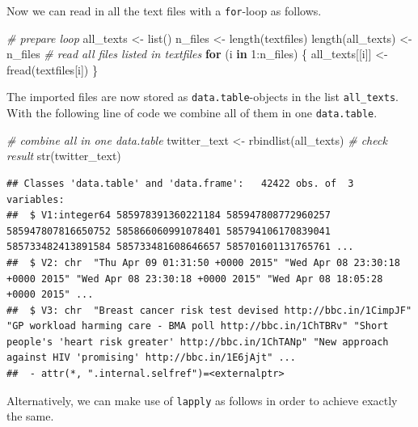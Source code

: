 \documentclass[
  12pt,
]{style/krantz}
\newenvironment{Shaded}{\begin{snugshade}}{\end{snugshade}}
\newcommand{\CommentTok}[1]{\textcolor[rgb]{0.56,0.35,0.01}{\textit{#1}}}
\newcommand{\ControlFlowTok}[1]{\textcolor[rgb]{0.13,0.29,0.53}{\textbf{#1}}}
\newcommand{\DecValTok}[1]{\textcolor[rgb]{0.00,0.00,0.81}{#1}}
\newcommand{\FunctionTok}[1]{\textcolor[rgb]{0.00,0.00,0.00}{#1}}
\newcommand{\NormalTok}[1]{#1}
\newcommand{\OtherTok}[1]{\textcolor[rgb]{0.56,0.35,0.01}{#1}}
\newcommand{\SpecialCharTok}[1]{\textcolor[rgb]{0.00,0.00,0.00}{#1}}
\begin{document}
Now we can read in all the text files with a \texttt{for}-loop as follows.

\begin{Shaded}
\begin{Highlighting}[]
\CommentTok{\# prepare loop}
\NormalTok{all\_texts }\OtherTok{\textless{}{-}} \FunctionTok{list}\NormalTok{()}
\NormalTok{n\_files }\OtherTok{\textless{}{-}} \FunctionTok{length}\NormalTok{(textfiles)}
\FunctionTok{length}\NormalTok{(all\_texts) }\OtherTok{\textless{}{-}}\NormalTok{ n\_files}
\CommentTok{\# read all files listed in textfiles}
\ControlFlowTok{for}\NormalTok{ (i }\ControlFlowTok{in} \DecValTok{1}\SpecialCharTok{:}\NormalTok{n\_files) \{}
\NormalTok{     all\_texts[[i]] }\OtherTok{\textless{}{-}} \FunctionTok{fread}\NormalTok{(textfiles[i])}
\NormalTok{\}}
\end{Highlighting}
\end{Shaded}

The imported files are now stored as \texttt{data.table}-objects in the list \texttt{all\_texts}. With the following line of code we combine all of them in one \texttt{data.table}.

\begin{Shaded}
\begin{Highlighting}[]
\CommentTok{\# combine all in one data.table}
\NormalTok{twitter\_text }\OtherTok{\textless{}{-}} \FunctionTok{rbindlist}\NormalTok{(all\_texts)}
\CommentTok{\# check result}
\FunctionTok{str}\NormalTok{(twitter\_text)}
\end{Highlighting}
\end{Shaded}

\begin{verbatim}
## Classes 'data.table' and 'data.frame':   42422 obs. of  3 variables:
##  $ V1:integer64 585978391360221184 585947808772960257 585947807816650752 585866060991078401 585794106170839041 585733482413891584 585733481608646657 585701601131765761 ... 
##  $ V2: chr  "Thu Apr 09 01:31:50 +0000 2015" "Wed Apr 08 23:30:18 +0000 2015" "Wed Apr 08 23:30:18 +0000 2015" "Wed Apr 08 18:05:28 +0000 2015" ...
##  $ V3: chr  "Breast cancer risk test devised http://bbc.in/1CimpJF" "GP workload harming care - BMA poll http://bbc.in/1ChTBRv" "Short people's 'heart risk greater' http://bbc.in/1ChTANp" "New approach against HIV 'promising' http://bbc.in/1E6jAjt" ...
##  - attr(*, ".internal.selfref")=<externalptr>
\end{verbatim}

Alternatively, we can make use of \texttt{lapply} as follows in order to achieve exactly the same.
\end{document}
